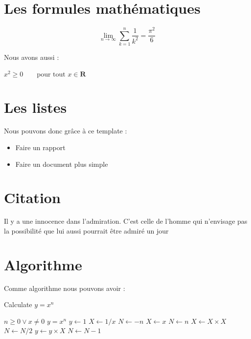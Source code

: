 \documentclass[a4paper, 12pt]{book}
\begin{document}
\section{Les formules mathématiques}

 \begin{equation}
    \lim_{n \to \infty}
    \sum_{k=1}^n \frac{1}{k^2}
    = \frac{\pi^2}{6}
    \end{equation}

 
Nous avons aussi :

 $x^{2} \geq 0\qquad
    \text{pour tout } x\in\mathbf{R}$



\section{Les listes}

Nous pouvons donc grâce à ce template :
\begin{itemize}

    \item {Faire un rapport}
    \item {Faire un document plus simple}
\end{itemize}

\section{Citation}

Il y a une innocence dans l’admiration. C’est celle de l’homme qui n’envisage pas la possibilité que lui aussi pourrait être admiré un jour \cite{livre}


\section{Algorithme}

Comme algorithme nous pouvons avoir :

\begin{algorithm}
\caption{Calculate $y = x^n$}
\begin{algorithmic} 
\REQUIRE $n \geq 0 \vee x \neq 0$
\ENSURE $y = x^n$
\STATE $y \leftarrow 1$
\STATE $X \leftarrow 1 / x$
\STATE $N \leftarrow -n$
\ELSE
\STATE $X \leftarrow x$
\STATE $N \leftarrow n$
\ENDIF
{}
\STATE $X \leftarrow X \times X$
\STATE $N \leftarrow N / 2$
\ELSE[$N$ is odd]
\STATE $y \leftarrow y \times X$
\STATE $N \leftarrow N - 1$
\ENDIF
\ENDWHILE
\end{algorithmic}
\end{algorithm}






\end{document}
